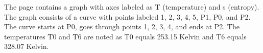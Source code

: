 The page contains a graph with axes labeled as T (temperature) and s (entropy). The graph consists of a curve with points labeled 1, 2, 3, 4, 5, P1, P0, and P2. The curve starts at P0, goes through points 1, 2, 3, 4, and ends at P2. The temperatures T0 and T6 are noted as T0 equals 253.15 Kelvin and T6 equals 328.07 Kelvin.